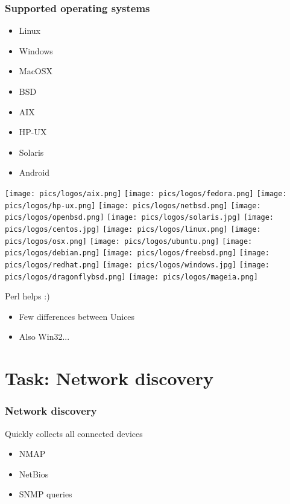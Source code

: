 \documentclass{beamer}
\begin{document}
\begin{frame}
    \frametitle{Supported operating systems}

    \begin{itemize}
        \item Linux
        \item Windows
        \item MacOSX
        \item BSD
        \item AIX
        \item HP-UX
        \item Solaris
        \item Android
    \end{itemize}


\texttt{[image: pics/logos/aix.png]}
\texttt{[image: pics/logos/fedora.png]}
\texttt{[image: pics/logos/hp-ux.png]}
\texttt{[image: pics/logos/netbsd.png]}
\texttt{[image: pics/logos/openbsd.png]}
\texttt{[image: pics/logos/solaris.jpg]}
\texttt{[image: pics/logos/centos.jpg]}
\texttt{[image: pics/logos/linux.png]}
\texttt{[image: pics/logos/osx.png]}
\texttt{[image: pics/logos/ubuntu.png]}
\texttt{[image: pics/logos/debian.png]}
\texttt{[image: pics/logos/freebsd.png]}
\texttt{[image: pics/logos/redhat.png]}
\texttt{[image: pics/logos/windows.jpg]}
\texttt{[image: pics/logos/dragonflybsd.png]}
\texttt{[image: pics/logos/mageia.png]}

\end{frame}

\begin{frame}    
    \begin{block}{Perl helps :)}
        \begin{itemize}
            \item Few differences between Unices
            \item Also Win32...
        \end{itemize}
    \end{block}
\end{frame}

\section{Task: Network discovery}

\begin{frame}
    \frametitle{Network discovery}

    \begin{block}{Quickly collects all connected devices}
    \begin{itemize}
      \item NMAP 
      \item NetBios
      \item SNMP queries
    \end{itemize}
    \end{block}

\end{frame}
\end{document}
